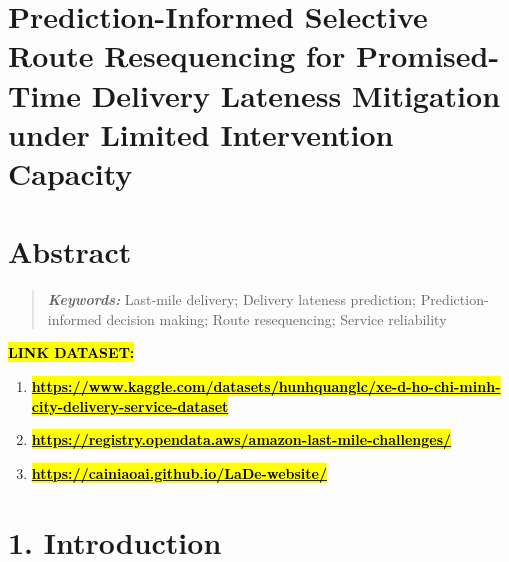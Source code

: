 \documentclass[
]{article}
\author{}
\date{}
\begin{document}
\section{\texorpdfstring{\textbf{Prediction-Informed Selective Route
Resequencing for Promised-Time Delivery Lateness Mitigation under
Limited Intervention
Capacity}}{Prediction-Informed Selective Route Resequencing for Promised-Time Delivery Lateness Mitigation under Limited Intervention Capacity}}\label{prediction-informed-selective-route-resequencing-for-promised-time-delivery-lateness-mitigation-under-limited-intervention-capacity}

\section{}\label{section}

\section{\texorpdfstring{\textbf{Abstract}}{Abstract}}\label{abstract}

\begin{quote}
\emph{\textbf{Keywords:}} Last-mile delivery; Delivery lateness
prediction; Prediction-informed decision making; Route resequencing;
Service reliability
\end{quote}

\textbf{\hl{LINK DATASET:}}

\begin{enumerate}
\def\labelenumi{\arabic{enumi}.}
\item
  \href{https://www.kaggle.com/datasets/hunhquanglc/xe-d-ho-chi-minh-city-delivery-service-dataset}{\textbf{\hl{https://www.kaggle.com/datasets/hunhquanglc/xe-d-ho-chi-minh-city-delivery-service-dataset}}}
\item
  \href{https://registry.opendata.aws/amazon-last-mile-challenges/}{\textbf{\hl{https://registry.opendata.aws/amazon-last-mile-challenges/}}}
\item
  \href{https://cainiaoai.github.io/LaDe-website/}{\textbf{\hl{https://cainiaoai.github.io/LaDe-website/}}}
\end{enumerate}

\section{\texorpdfstring{\textbf{1.
Introduction}}{1. Introduction}}\label{introduction}
\end{document}
